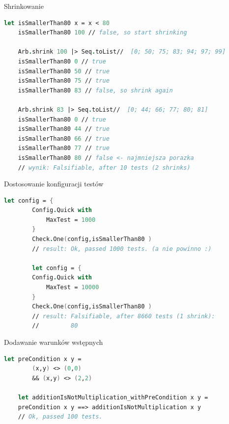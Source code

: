     \begin{frame}[fragile]{Shrinkowanie}
        \begin{lstlisting}[language=FSharp, xleftmargin=-10pt,xrightmargin=-10pt,numbers=none,basicstyle=\ttfamily\small]
    let isSmallerThan80 x = x < 80
    isSmallerThan80 100 // false, so start shrinking

    Arb.shrink 100 |> Seq.toList//  [0; 50; 75; 83; 94; 97; 99]
    isSmallerThan80 0 // true
    isSmallerThan80 50 // true
    isSmallerThan80 75 // true
    isSmallerThan80 83 // false, so shrink again

    Arb.shrink 83 |> Seq.toList//  [0; 44; 66; 77; 80; 81]
    isSmallerThan80 0 // true
    isSmallerThan80 44 // true
    isSmallerThan80 66 // true
    isSmallerThan80 77 // true
    isSmallerThan80 80 // false <- najmniejsza porazka
    // wynik: Falsifiable, after 10 tests (2 shrinks)
        \end{lstlisting}
    \end{frame}
    
    \begin{frame}[fragile]{Dostosowanie konfiguracji testów}
    \begin{lstlisting}[language=FSharp, xleftmargin=-10pt,xrightmargin=-10pt,numbers=none]
    let config = {
        Config.Quick with
            MaxTest = 1000
        }
        Check.One(config,isSmallerThan80 )
        // result: Ok, passed 1000 tests. (a nie powinno :)
        
        let config = {
        Config.Quick with
            MaxTest = 10000
        }
        Check.One(config,isSmallerThan80 )
        // result: Falsifiable, after 8660 tests (1 shrink):
        //         80
    \end{lstlisting}
    \end{frame}
    
    \begin{frame}[fragile]{Dodawanie warunków wstępnych}
    \begin{lstlisting}[language=FSharp, xleftmargin=-10pt,xrightmargin=-10pt,numbers=none]
    let preCondition x y =
        (x,y) <> (0,0)
        && (x,y) <> (2,2)

    let additionIsNotMultiplication_withPreCondition x y =
    preCondition x y ==> additionIsNotMultiplication x y
    // Ok, passed 100 tests.
    \end{lstlisting}
    \end{frame}
    
